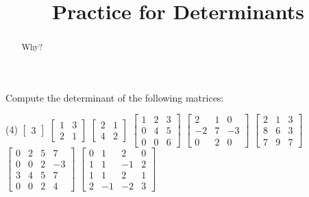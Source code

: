 \documentclass{ximera}
\title{Practice for Determinants}
\begin{document}
\begin{abstract}
Why?
\end{abstract}
\maketitle



\begin{exercise}
    Compute the determinant of the following matrices:
    \begin{tasks}(4)
        \task
        $\begin{bmatrix}
            3
        \end{bmatrix}$
        \task
        $\begin{bmatrix}
            1 & 3 \\
            2 & 1
        \end{bmatrix}$
        \task
        $\begin{bmatrix}
            2 & 1 \\
            4 & 2
        \end{bmatrix}$
        \task
            $\begin{bmatrix}
            1 & 2 & 3 \\
            0 & 4 & 5 \\
            0 & 0 & 6
        \end{bmatrix}$
        \task
        $\begin{bmatrix}
            2 & 1 & 0 \\
            -2 & 7 & -3 \\
            0 & 2 & 0
        \end{bmatrix}$
        \task
        $\begin{bmatrix}
            2 & 1 & 3 \\
            8 & 6 & 3 \\
            7 & 9 & 7
        \end{bmatrix}$
        \task
        $\begin{bmatrix}
            0 & 2 & 5 & 7 \\
            0 & 0 & 2 & -3 \\
            3 & 4 & 5 & 7 \\
            0 & 0 & 2 & 4
        \end{bmatrix}$
        \task
        $\begin{bmatrix}
            0 &  1 &  2 &  0 \\
            1 &  1 & -1 & 2 \\
            1 &  1 &  2 & 1 \\
            2 & -1 & -2 & 3
        \end{bmatrix}$
    \end{tasks}
\end{exercise}
\end{document}
